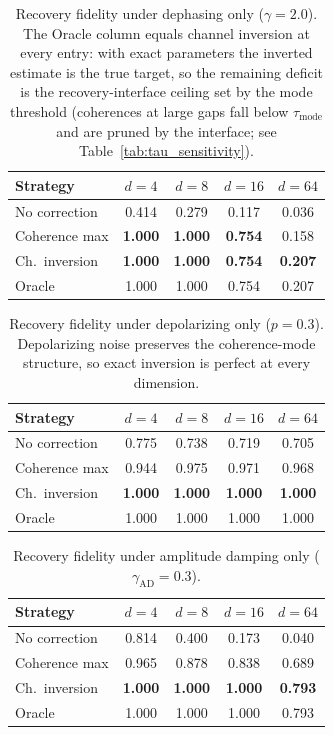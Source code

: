 \documentclass[pra,twocolumn,superscriptaddress,longbibliography,floatfix,nofootinbib]{revtex4-2}
\begin{document}
\begin{table}[!tb]
\caption{Recovery fidelity under dephasing only ($\gamma = 2.0$).
The Oracle column equals channel inversion at every entry: with exact parameters the inverted estimate is the true target, so the remaining deficit is the recovery-interface ceiling set by the mode threshold (coherences at large gaps fall below $\tau_\mathrm{mode}$ and are pruned by the interface; see Table~\ref{tab:tau_sensitivity}).}
\label{tab:dephasing_only}

\begin{tabular}{lcccc}
Strategy & $d{=}4$ & $d{=}8$ & $d{=}16$ & $d{=}64$ \\
\hline
No correction   & 0.414 & 0.279 & 0.117 & 0.036 \\
Coherence max   & \textbf{1.000} & \textbf{1.000} & \textbf{0.754} & 0.158 \\
Ch.\ inversion  & \textbf{1.000} & \textbf{1.000} & \textbf{0.754} & \textbf{0.207} \\
Oracle          & 1.000 & 1.000 & 0.754 & 0.207 \\
\end{tabular}

\end{table}

\begin{table}[!tb]
\caption{Recovery fidelity under depolarizing only ($p = 0.3$).
Depolarizing noise preserves the coherence-mode structure, so exact inversion is perfect at every dimension.}
\label{tab:depol_only}

\begin{tabular}{lcccc}
Strategy & $d{=}4$ & $d{=}8$ & $d{=}16$ & $d{=}64$ \\
\hline
No correction   & 0.775 & 0.738 & 0.719 & 0.705 \\
Coherence max   & 0.944 & 0.975 & 0.971 & 0.968 \\
Ch.\ inversion  & \textbf{1.000} & \textbf{1.000} & \textbf{1.000} & \textbf{1.000} \\
Oracle          & 1.000 & 1.000 & 1.000 & 1.000 \\
\end{tabular}

\end{table}

\begin{table}[!tb]
\caption{Recovery fidelity under amplitude damping only ($\gamma_\mathrm{AD} = 0.3$).}
\label{tab:ampdamp_only}

\begin{tabular}{lcccc}
Strategy & $d{=}4$ & $d{=}8$ & $d{=}16$ & $d{=}64$ \\
\hline
No correction   & 0.814 & 0.400 & 0.173 & 0.040 \\
Coherence max   & 0.965 & 0.878 & 0.838 & 0.689 \\
Ch.\ inversion  & \textbf{1.000} & \textbf{1.000} & \textbf{1.000} & \textbf{0.793} \\
Oracle          & 1.000 & 1.000 & 1.000 & 0.793 \\
\end{tabular}

\end{table}
\end{document}
